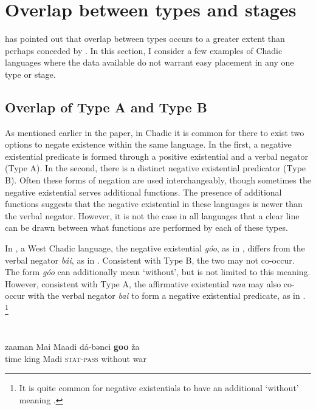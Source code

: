 \documentclass[output=paper,draft,draftmode,colorlinks,citecolor=brown]{langscibook}
\begin{document}
\section{Overlap between types and stages}\label{sec:3:4}

\citet{Veselinova2016} has pointed out that overlap between types occurs to a greater extent than perhaps conceded by \citet{Croft1991}. In this section, I consider a few examples of Chadic languages where the data available do not warrant easy placement in any one type or stage. 

\subsection{Overlap of Type A and Type B}\label{sec:3:4.1}

As mentioned earlier in the paper, in Chadic it is common for there to exist two options to negate existence within the same language. In the first, a negative existential predicate is formed through a positive existential and a verbal negator (Type A). In the second, there is a distinct negative existential predicator (Type B). Often these forms of negation are used interchangeably, though sometimes the negative existential serves additional functions. The presence of additional functions suggests that the negative existential in these languages is newer than the verbal negator. However, it is not the case in all languages that a clear line can be drawn between what functions are performed by each of these types. 

In , a West Chadic language, the negative existential
\textit{góo}, as in , differs from the verbal negator
\textit{bái}, as in . Consistent with Type B, the
two may not co-occur. The form \textit{góo} can additionally mean
`without', but is not limited to this meaning. However, consistent with
Type A, the affirmative existential \textit{naa} may also co-occur with the
verbal negator \textit{bai} to form a negative existential predicate, as in
.%
\footnote{It is quite common for negative existentials
to have an additional `without' meaning \citep[20]{Veselinova2013}.}

\ea\label{ex:ngizim-king-Ngwajin-oil}
\\ 

\ea\label{ex:ngizim-king}

\gll zaaman Mai Maadi dá-bənci \textbf{goo} \v za\\
time king Madi \textsc{stat-pass} without war\\ 
\end{document}
